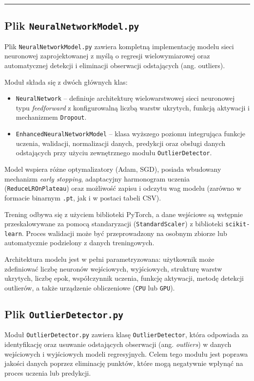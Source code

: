 \documentclass{classrep}
\begin{document}
\noindent\rule{8cm}{0.4pt}

\subsection{Plik \texttt{NeuralNetworkModel.py}}

Plik \texttt{NeuralNetworkModel.py} zawiera kompletną implementację modelu sieci neuronowej zaprojektowanej z myślą o regresji wielowymiarowej oraz automatycznej detekcji i eliminacji obserwacji odstających (ang. outliers).

Moduł składa się z dwóch głównych klas:
\begin{itemize}
	\item \texttt{NeuralNetwork} – definiuje architekturę wielowarstwowej sieci neuronowej typu \textit{feedforward} z konfigurowalną liczbą warstw ukrytych, funkcją aktywacji i mechanizmem \texttt{Dropout}.
	\item \texttt{EnhancedNeuralNetworkModel} – klasa wyższego poziomu integrująca funkcje uczenia, walidacji, normalizacji danych, predykcji oraz obsługi danych odstających przy użyciu zewnętrznego modułu \texttt{OutlierDetector}.
\end{itemize}

Model wspiera różne optymalizatory (Adam, SGD), posiada wbudowany mechanizm \textit{early stopping}, adaptacyjny harmonogram uczenia (\texttt{ReduceLROnPlateau}) oraz możliwość zapisu i odczytu wag modelu (zarówno w formacie binarnym \texttt{.pt}, jak i w postaci tabeli CSV).

Trening odbywa się z użyciem biblioteki PyTorch, a dane wejściowe są wstępnie przeskalowywane za pomocą standaryzacji (\texttt{StandardScaler}) z biblioteki \texttt{scikit-learn}. Proces walidacji może być przeprowadzony na osobnym zbiorze lub automatycznie podzielony z danych treningowych.

Architektura modelu jest w pełni parametryzowana: użytkownik może zdefiniować liczbę neuronów wejściowych, wyjściowych, strukturę warstw ukrytych, liczbę epok, współczynnik uczenia, funkcję aktywacji, metodę detekcji outlierów, a także urządzenie obliczeniowe (\texttt{CPU} lub \texttt{GPU}).

\clearpage{}
\subsection{Plik \texttt{OutlierDetector.py}}

Moduł \texttt{OutlierDetector.py} zawiera klasę \texttt{OutlierDetector}, która odpowiada za identyfikację oraz usuwanie odstających obserwacji (ang. \textit{outliers}) w danych wejściowych i wyjściowych modeli regresyjnych. Celem tego modułu jest poprawa jakości danych poprzez eliminację punktów, które mogą negatywnie wpłynąć na proces uczenia lub predykcji.
\end{document}
